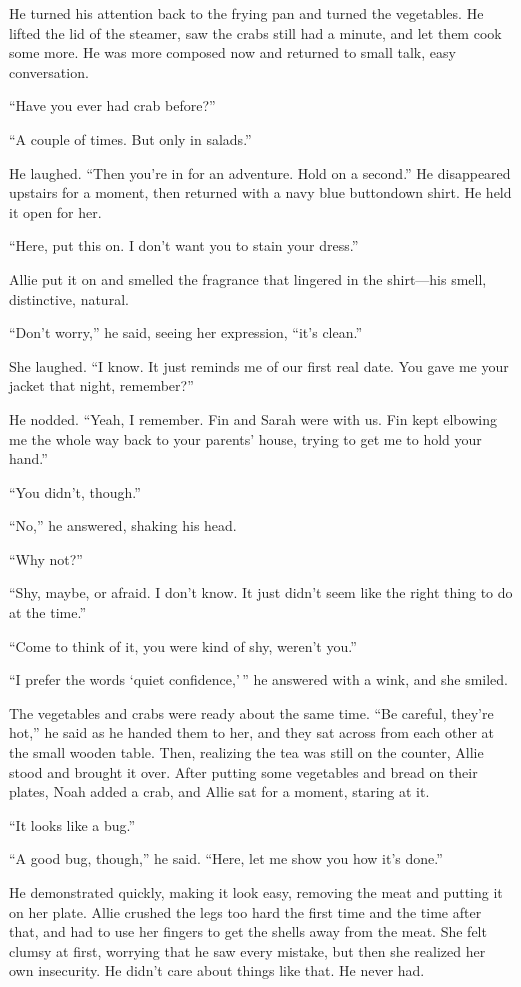 \documentclass[10pt, twoside, openright]{book}
\begin{document}
He turned his attention back to the frying pan and turned the
vegetables. He lifted the lid of the steamer, saw the crabs still had a
minute, and let them cook some more. He was more composed now and
returned to small talk, easy conversation.


``Have you ever had crab before?''

``A couple of times. But only in salads.''


He laughed. ``Then you're in for an adventure. Hold on a second.'' He
disappeared upstairs for a moment, then returned with a navy blue
buttondown shirt. He held it open for her.


``Here, put this on. I don't want you to stain your dress.''


Allie put it on and smelled the fragrance that lingered in the
shirt---his smell, distinctive, natural.


``Don't worry,'' he said, seeing her expression, ``it's clean.''


She laughed. ``I know. It just reminds me of our first real date. You
gave me your jacket that night, remember?''

He nodded. ``Yeah, I remember. Fin and Sarah were with us. Fin kept
elbowing me the whole way back to your parents' house, trying to get me
to hold your hand.''


``You didn't, though.''

``No,'' he answered, shaking his head.

``Why not?''


``Shy, maybe, or afraid. I don't know. It just didn't seem like the
right thing to do at the time.''


``Come to think of it, you were kind of shy, weren't you.''


``I prefer the words `quiet confidence,'\,'' he answered with a wink,
and she smiled.

The vegetables and crabs were ready about the same time. ``Be careful,
they're hot,'' he said as he handed them to her, and they sat across
from each other at the small wooden table. Then, realizing the tea was
still on the counter, Allie stood and brought it over. After putting
some vegetables and bread on their plates, Noah added a crab, and Allie
sat for a moment, staring at it.


``It looks like a bug.''

``A good bug, though,'' he said. ``Here, let me show you how it's
done.''


He demonstrated quickly, making it look easy, removing the meat and
putting it on her plate. Allie crushed the legs too hard the first time
and the time after that, and had to use her fingers to get the shells
away from the meat. She felt clumsy at first, worrying that he saw every
mistake, but then she realized her own insecurity. He didn't care about
things like that. He never had.
\end{document}
